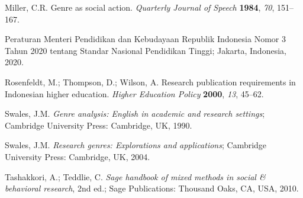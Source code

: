 \documentclass[journal,article,submit,pdftex,moreauthors]{Definitions/mdpi}
\begin{document}
\begin{thebibliography}{999}
 Miller, C.R. Genre as social action. \textit{Quarterly Journal of Speech} \textbf{1984}, \textit{70}, 151--167.

 Peraturan Menteri Pendidikan dan Kebudayaan Republik Indonesia Nomor 3 Tahun 2020 tentang Standar Nasional Pendidikan Tinggi; Jakarta, Indonesia, 2020.

 Rosenfeldt, M.; Thompson, D.; Wilson, A. Research publication requirements in Indonesian higher education. \textit{Higher Education Policy} \textbf{2000}, \textit{13}, 45--62.

 Swales, J.M. \textit{Genre analysis: English in academic and research settings}; Cambridge University Press: Cambridge, UK, 1990.

 Swales, J.M. \textit{Research genres: Explorations and applications}; Cambridge University Press: Cambridge, UK, 2004.

 Tashakkori, A.; Teddlie, C. \textit{Sage handbook of mixed methods in social \& behavioral research}, 2nd ed.; Sage Publications: Thousand Oaks, CA, USA, 2010.

\end{thebibliography}
\end{document}
